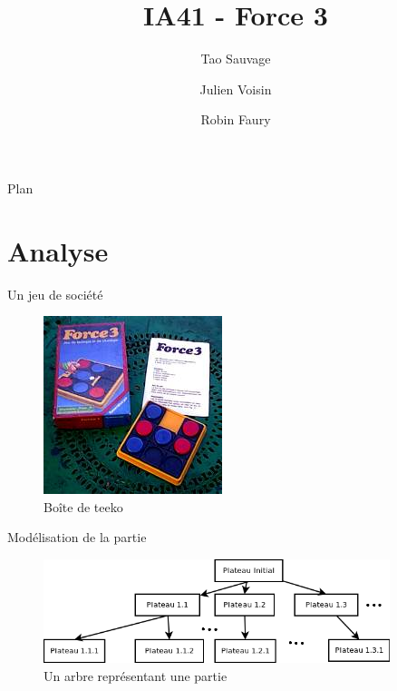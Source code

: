 \documentclass[compress, 12pt]{beamer}
\title{IA41 - Force 3}
\author{Tao Sauvage \and Julien Voisin \and Robin Faury}
\institute[UTBM]{Université de Technologie de Belfort Montbéliard}
\begin{document}
\begin{frame}
	\titlepage
\end{frame}


\begin{frame}{Plan}
    \tableofcontents
\end{frame}


\section{Analyse}

\begin{frame}{Un jeu de société}
  \begin{figure}
    \includegraphics[height=0.6\textheight]{./pix/plateau}
    \centering
    \caption{Boîte de teeko}
  \end{figure}
\end{frame}


\begin{frame}{Modélisation de la partie}
  \begin{figure}
    \includegraphics[width=0.9\textwidth]{./pix/arbre}
    \centering
    \caption{Un arbre représentant une partie}
  \end{figure}
\end{frame}
\end{document}
